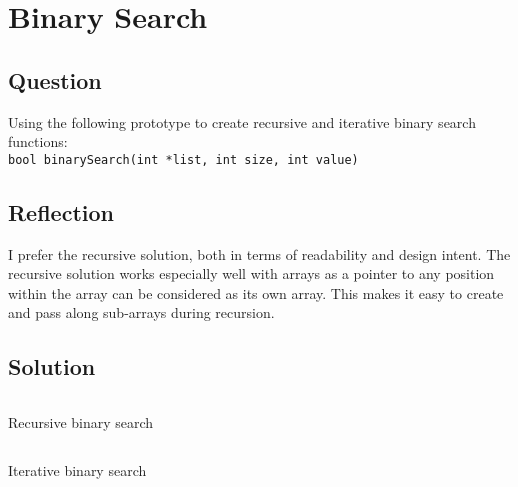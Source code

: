 \section{Binary Search}
    \subsection*{Question}
        Using the following prototype to create recursive and iterative binary search functions:\\
        \texttt{bool binarySearch(int *list, int size, int value)}

    \subsection*{Reflection}
        I prefer the recursive solution, both in terms of readability and design intent.
        The recursive solution works especially well with arrays as a pointer to any position
        within the array can be considered as its own array. 
        This makes it easy to create and pass along sub-arrays during recursion.

    \subsection*{Solution}
        \begin{listing}[H]
            \inputminted[firstline=33, lastline=62]{cpp}{../Tasks/03-BinarySearch/Main.cpp}
            \caption{Recursive binary search}
        \end{listing}

        \begin{listing}[H]
            \inputminted[firstline=64, lastline=93]{cpp}{../Tasks/03-BinarySearch/Main.cpp}
            \caption{Iterative binary search}
        \end{listing}
